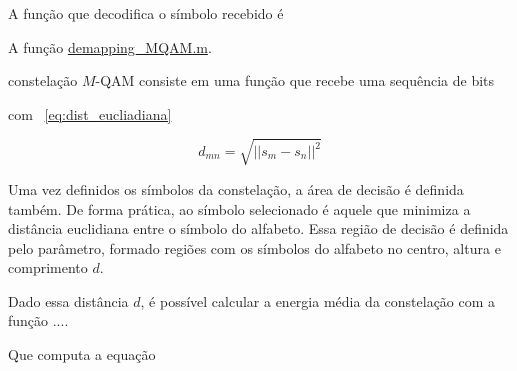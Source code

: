 A função que decodifica o símbolo recebido é 

A função \href{https://raw.githubusercontent.com/lucasabdalah/Courses-HWs/SCD/Sistemas%20de%20Comunicacoes%20Digitais/matlab/problema1/demapping_MQAM.m}{demapping\_MQAM.m}.

constelação $M$-QAM consiste em uma função que recebe uma sequência de bits

com ~\ref{eq:dist_eucliadiana}

\begin{equation}
    d_{mn} = \sqrt{|| s_m - s_n||^2}
    \label{eq:dist_eucliadiana}
\end{equation}

Uma vez definidos os símbolos da constelação, a área de decisão é definida também. De forma prática,  ao símbolo selecionado é aquele que minimiza a distância euclidiana entre o símbolo do alfabeto. Essa região de decisão é definida pelo parâmetro, formado regiões com os símbolos do alfabeto no centro, altura e comprimento $d$.

Dado essa distância $d$, é possível calcular a energia média da constelação com a função ....

Que computa a equação


